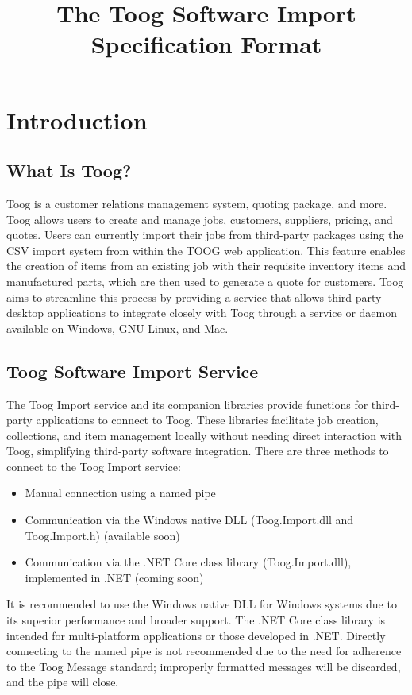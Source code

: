 \documentclass{memoir}
\begin{document}
	
	\title{The Toog Software Import Specification Format}
	\maketitle
	\tableofcontents
	\pagebreak
	
	\section{Introduction}
	
	\subsection{What Is Toog?}
	Toog is a customer relations management system, quoting package, and more. Toog allows users to create and manage jobs, customers, suppliers, pricing, and quotes. Users can currently import their jobs from third-party packages using the CSV import system from within the TOOG web application. This feature enables the creation of items from an existing job with their requisite inventory items and manufactured parts, which are then used to generate a quote for customers. Toog aims to streamline this process by providing a service that allows third-party desktop applications to integrate closely with Toog through a service or daemon available on Windows, GNU-Linux, and Mac.
	
	\subsection{Toog Software Import Service}
	The Toog Import service and its companion libraries provide functions for third-party applications to connect to Toog. These libraries facilitate job creation, collections, and item management locally without needing direct interaction with Toog, simplifying third-party software integration. There are three methods to connect to the Toog Import service:
	
	\begin{itemize}
		\item Manual connection using a named pipe
		\item Communication via the Windows native DLL (Toog.Import.dll and Toog.Import.h) (available soon)
		\item Communication via the .NET Core class library (Toog.Import.dll), implemented in .NET (coming soon)
	\end{itemize}
	
	It is recommended to use the Windows native DLL for Windows systems due to its superior performance and broader support. The .NET Core class library is intended for multi-platform applications or those developed in .NET. Directly connecting to the named pipe is not recommended due to the need for adherence to the Toog Message standard; improperly formatted messages will be discarded, and the pipe will close.
	
\end{document}
